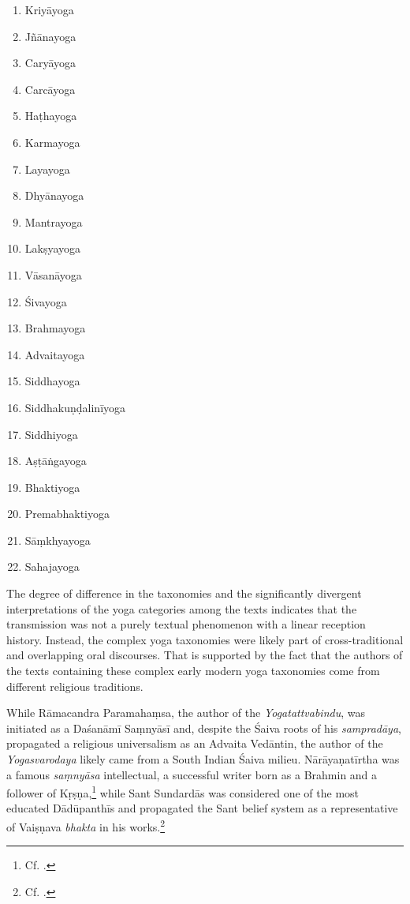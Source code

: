 \begin{enumerate}
\item Kriyāyoga
\item Jñānayoga
\item Caryāyoga
\item Carcāyoga
\item Haṭhayoga
\item Karmayoga
\item Layayoga
\item Dhyānayoga
\item Mantrayoga
\item Lakṣyayoga
\item Vāsanāyoga
\item Śivayoga
\item Brahmayoga
\item Advaitayoga
\item Siddhayoga
\item Siddhakuṇḍalinīyoga 
\item Siddhiyoga
\item Aṣṭāṅgayoga
\item Bhaktiyoga
\item Premabhaktiyoga
\item Sāṃkhyayoga
\item Sahajayoga 
\end{enumerate}

The degree of difference in the taxonomies and the significantly divergent interpretations of the yoga categories among the texts indicates that the transmission was not a purely textual phenomenon with a linear reception history. Instead, the complex yoga taxonomies were likely part of cross-traditional and overlapping oral discourses. That is supported by the fact that the authors of the texts containing these complex early modern yoga taxonomies come from different religious traditions.

While Rāmacandra Paramahaṃsa, the author of the \emph{Yogatattvabindu}, was initiated as a Daśanāmī Saṃnyāsī and, despite the Śaiva roots of his \textit{sampradāya}, propagated a religious universalism as an Advaita Vedāntin, the author of the \textit{Yogasvarodaya} likely came from a South Indian Śaiva milieu. Nārāyaṇatīrtha was a famous \textit{saṃnyāsa} intellectual, a successful writer born as a Brahmin and a follower of Kṛṣṇa,\footnote{Cf. \citeauthor[1993: 41]{endo1993}.} while Sant Sundardās was considered one of the most educated Dādūpanthīs and propagated the Sant belief system as a representative of Vaiṣṇava \textit{bhakta} in his works.\footnote{Cf. \citeauthor[2023: 84-87]{horstmann2023shrine}.}

